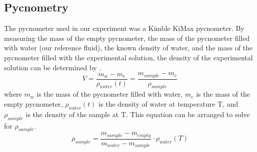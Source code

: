 \documentclass[lettersize,journal]{IEEEtran}
\begin{document}
	\subsection{Pycnometry}
	The pycnometer used in our experiment was a Kimble KiMax pycnometer. By measuring the mass of the empty pycnometer, the mass of the pycnometer filled with water (our reference fluid), the known density of water, and the mass of the pycnometer filled with the experimental solution, the density of the experimental solution can be determined by \cite{ref1}. 
	\begin{equation}
		\label{deqn_ex1}
		V = \frac{m_{w}-m_{e}}{\rho_{water}(t)} = \frac{m_{sample}-m_{e}}{\rho_{sample}}
	\end{equation}
	where $m_{w}$ is the mass of the pycnometer filled with water, $m_{e}$ is the mass of the empty pycnometer, $\rho_{water}(t)$ is the density of water at temperature T, and $\rho_{sample}$ is the density of the sample at T. This equation can be arranged to solve for $\rho_{sample}$.
	\begin{equation}
		\label{deqn_ex2}
		\rho_{sample}  = \frac{m_{sample} - m_{empty}}{m_{water}-m_{sample}}\cdot\rho_{water}(T)
	\end{equation}
	
\end{document}
